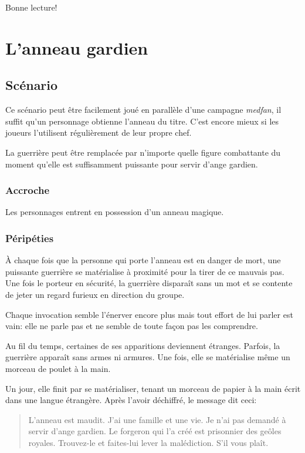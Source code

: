 \documentclass[a5paper,pagesize,10pt,bibliography=totoc,numbers=enddot,
headings=normal,DIV=9,twoside=false,tablecaptionabove]{scrbook}
\begin{document}
Bonne lecture!

\setcounter{tocdepth}{0}
\tableofcontents

\chapter{L'anneau gardien}

\section{Scénario}

Ce scénario peut être facilement joué en parallèle d'une campagne \emph{medfan}, il suffit qu'un personnage obtienne l'anneau du titre.
C'est encore mieux si les joueurs l'utilisent régulièrement de leur propre chef.

La guerrière peut être remplacée par n'importe quelle figure combattante du moment qu'elle est suffisamment puissante pour servir d'ange gardien.

\subsection*{Accroche}

Les personnages entrent en possession d'un anneau magique.

\subsection*{Péripéties}

À chaque fois que la personne qui porte l'anneau est en danger de mort, une puissante guerrière se matérialise à proximité pour la tirer de ce mauvais pas.
Une fois le porteur en sécurité, la guerrière disparaît sans un mot et se contente de jeter un regard furieux en direction du groupe.

Chaque invocation semble l'énerver encore plus mais tout effort de lui parler est vain: elle ne parle pas et ne semble de toute façon pas les comprendre.

Au fil du temps, certaines de ses apparitions deviennent étranges. Parfois, la guerrière apparaît sans armes ni armures.
Une fois, elle se matérialise même un morceau de poulet à la main.

Un jour, elle finit par se matérialiser, tenant un morceau de papier à la main écrit dans une langue étrangère.
Après l'avoir déchiffré, le message dit ceci:
\blockquote{L'anneau est maudit. J'ai une famille et une vie. Je n'ai pas demandé à servir d'ange gardien. Le forgeron qui l'a créé est prisonnier des geôles royales. Trouvez-le et faites-lui lever la malédiction. S'il vous plaît.}
\end{document}
